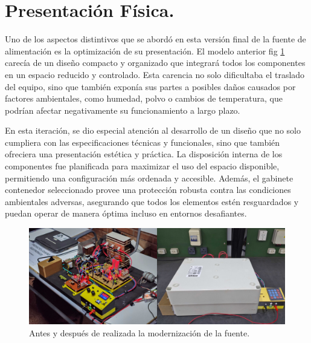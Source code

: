 \section{Presentación Física.}
Uno de los aspectos distintivos que se abordó en esta versión final de la fuente de alimentación es la optimización de su presentación. El modelo anterior fig \ref{F:fuente_anterior} carecía de un diseño compacto y organizado que integrará todos los componentes en un espacio reducido y controlado. Esta carencia no solo dificultaba el traslado del equipo, sino que también exponía sus partes a posibles daños causados por factores ambientales, como humedad, polvo o cambios de temperatura, que podrían afectar negativamente su funcionamiento a largo plazo.\par
En esta iteración, se dio especial atención al desarrollo de un diseño que no solo cumpliera con las especificaciones técnicas y funcionales, sino que también ofreciera una presentación estética y práctica. La disposición interna de los componentes fue planificada para maximizar el uso del espacio disponible, permitiendo una configuración más ordenada y accesible. Además, el gabinete contenedor seleccionado provee una protección robusta contra las condiciones ambientales adversas, asegurando que todos los elementos estén resguardados y puedan operar de manera óptima incluso en entornos desafiantes.\par

\begin{figure}[H]
    \centering
    \includegraphics[scale=0.05]{./imagenes/fuente_anterior.jpg}
    \caption{Antes y después de realizada la modernización de la fuente.}
    \label{F:fuente_anterior}
\end{figure}

